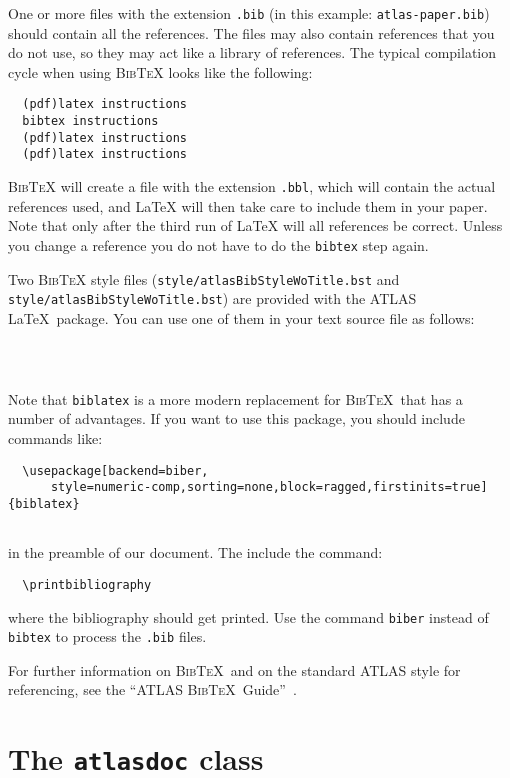 \documentclass[coverpage]{style/atlasdoc}
\newcommand{\BibTeX}{\textsc{Bib\TeX}}
\begin{document}
One or more files with the extension \texttt{.bib} 
(in this example: \texttt{atlas-paper.bib}) should contain all the references. 
The files may also contain references that you do not use, so they may act like a
library of references. 
The typical compilation cycle when using \BibTeX{} looks like the following:
%
\begin{verbatim}
  (pdf)latex instructions
  bibtex instructions
  (pdf)latex instructions
  (pdf)latex instructions
\end{verbatim}
%
\BibTeX{} will create a file with the extension \texttt{.bbl}, which will
contain the actual references used, and \LaTeX{} will then take care
to include them in your paper. Note that only after the third run of
\LaTeX{} will all references be correct. Unless you change a reference
you do not have to do the \texttt{bibtex} step again.

Two \BibTeX{} style files 
(\texttt{style/atlasBibStyleWoTitle.bst} and \texttt{style/atlasBibStyleWoTitle.bst})
are provided with the ATLAS \LaTeX\ package. 
You can use one of them in your text source file as follows:
%
\begin{verbatim}
  
  
\end{verbatim}

Note that \texttt{biblatex} is a more modern replacement for \BibTeX\ that has a number of advantages.
If you want to use this package, you should include commands like:
%
\begin{verbatim}
  \usepackage[backend=biber,
	  style=numeric-comp,sorting=none,block=ragged,firstinits=true]{biblatex}
  
\end{verbatim}
%
in the preamble of our document.
The include the command:
%
\begin{verbatim}
  \printbibliography
\end{verbatim}
%
where the bibliography should get printed.
Use the command \texttt{biber} instead of \texttt{bibtex} to process the \texttt{.bib} files.

For further information on \BibTeX\ and on the standard ATLAS style for referencing, 
see the ``ATLAS \BibTeX\ Guide''~\cite{atlas-bibtex}.


\section{The \texttt{atlasdoc} class}
\label{app:atlasdoc}
\end{document}
